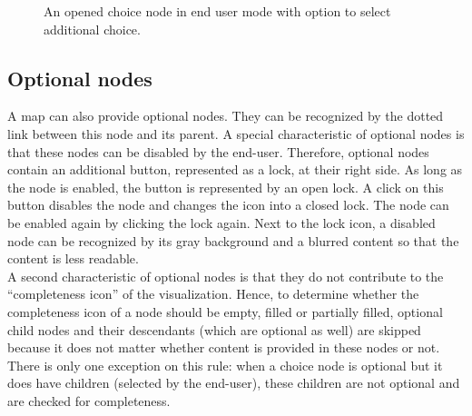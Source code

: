 \begin{figure}[H]
	\centering
	\caption{An opened choice node in end user mode with option to select additional choice.}
	\label{fig:gm-choicenode-enduser-extraoption}
\end{figure}



\subsection{Optional nodes}\label{sec:optional-nodes}
A map can also provide optional nodes. They can be recognized by the dotted link between this node and its parent. A special characteristic of optional nodes is that these nodes can be disabled by the end-user. Therefore, optional nodes contain an additional button, represented as a lock, at their right side. As long as the node is enabled, the button is represented by an open lock. A click on this button disables the node and changes the icon into a closed lock. The node can be enabled again by clicking the lock again. Next to the lock icon, a disabled node can be recognized by its gray background and a blurred content so that the content is less readable.\\

A second characteristic of optional nodes is that they do not contribute to the ``completeness icon'' of the visualization. Hence, to determine whether the completeness icon of a node should be empty, filled or partially filled, optional child nodes and their descendants (which are optional as well) are skipped because it does not matter whether content is provided in these nodes or not. There is only one exception on this rule: when a choice node is optional but it does have children (selected by the end-user), these children are not optional and are checked for completeness.














